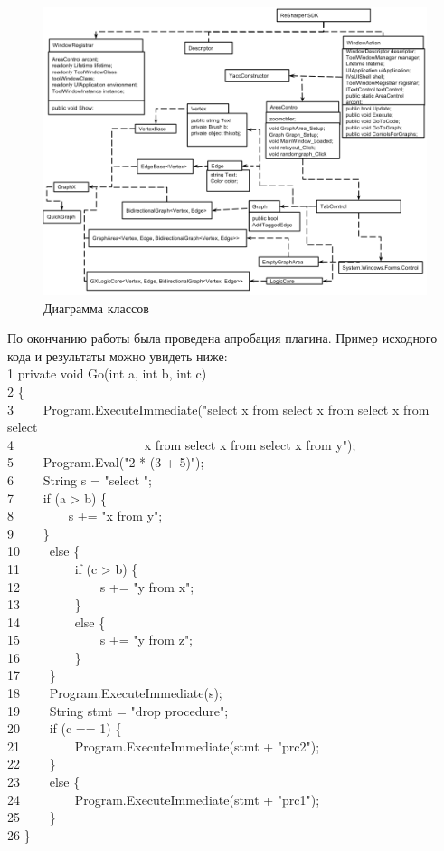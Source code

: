 \documentclass{matmex-diploma}
\begin{document}
\begin{figure}[h]
\label{Diagram}
\centering
\includegraphics[width=\textwidth]{ClassDiagram.png}
\caption{Диаграмма классов}
\end{figure}

\newpage{}
По окончанию работы была проведена апробация плагина. Пример исходного кода и результаты можно увидеть ниже:\\
1 private void Go(int a, int b, int c)\\
2 \{\\
3 \ \ \ \ Program.ExecuteImmediate("select x from select x from select x from select\\
4 \ \ \ \ \ \ \ \ \ \ \ \ \ \ \ \ \ \ \ \ x from select x from select x from y");\\
5 \ \ \ \ Program.Eval("2 * (3 + 5)");\\
6 \ \ \ \ String s = "select ";\\
7 \ \ \ \ if (a > b) \{\\
8 \ \ \ \ \ \ \ \ s += "x from y";\\
9 \ \ \ \ \}\\
10 \ \ \ \ else \{\\
11 \ \ \ \ \ \ \ \ if (c > b) \{\\
12 \ \ \ \ \ \ \ \ \ \ \ \ s += "y from x";\\
13 \ \ \ \ \ \ \ \ \}\\
14 \ \ \ \ \ \ \ \ else \{\\
15 \ \ \ \ \ \ \ \ \ \ \ \ s += "y from z";\\
16 \ \ \ \ \ \ \ \ \}\\
17 \ \ \ \ \}\\
18 \ \ \ \ Program.ExecuteImmediate(s);\\
19 \ \ \ \ String stmt = "drop procedure";\\
20 \ \ \ \ if (c == 1) \{\\
21 \ \ \ \ \ \ \ \ Program.ExecuteImmediate(stmt + "prc2");\\
22 \ \ \ \ \}\\
23 \ \ \ \ else \{\\
24 \ \ \ \ \ \ \ \ Program.ExecuteImmediate(stmt + "prc1");\\
25 \ \ \ \ \}\\
26 \}\\
\end{document}
